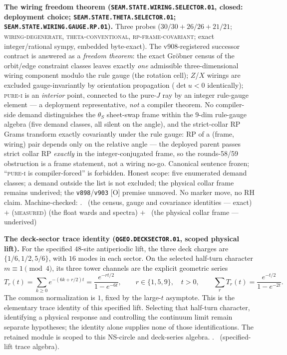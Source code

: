 \documentclass[11pt,a4paper]{article}
\theoremstyle{definition}
\begin{document}
\par\smallskip\noindent\textbf{The wiring freedom theorem
(\texttt{SEAM.STATE.WIRING.\allowbreak SELECTOR.01}, closed:
deployment choice;
\texttt{SEAM.STATE.THETA.\allowbreak SELECTOR.01};
\texttt{SEAM.STATE.WIRING.\allowbreak GAUGE.RP.01}).}
Three probes ($30/30 + 26/26 + 21/21$;
\textsc{wiring-degenerate}, \textsc{theta-conventional},
\textsc{rp-frame-covariant}; exact integer/rational sympy,
embedded byte-exact).  The v908-registered successor contract
is answered as a \emph{freedom theorem}: the exact Gr\"obner
census of the orbit/edge constraint classes leaves exactly
\emph{one} admissible three-dimensional wiring component modulo
the rule gauge (the rotation cell); $Z$/$X$ wirings are
excluded gauge-invariantly by orientation propagation
($\det u < 0$ identically); \textsc{pure-i} is an
\emph{interior} point, connected to the pure-$J$ ray by an
integer rule-gauge element --- a deployment representative,
\emph{not} a compiler theorem.  No compiler-side demand
distinguishes the $\theta_S$ sheet-swap frame within the
$9$-dim rule-gauge algebra (five demand classes, all silent on
the angle), and the strict-collar RP Grams transform exactly
covariantly under the rule gauge: RP of a (frame, wiring) pair
depends only on the relative angle --- the deployed parent
passes strict collar RP \emph{exactly} in the
integer-conjugated frame, so the rounds-58/59 obstruction is a
frame statement, not a wiring no-go.  Canonical sentence
frozen; ``\textsc{pure-i} is compiler-forced'' is forbidden.
Honest scope: five enumerated demand classes; a demand outside
the list is not excluded; the physical collar frame remains
underived; the \texttt{v898}/\texttt{v903} [O] premise
unmoved.  No marker move, no RH claim.
Machine-checked: .
\mE\ (the census, gauge and covariance identities --- exact)
$+$ (\textsc{measured}) (the float wards and spectra) $+$
\mO\ (the physical collar frame --- underived)
\par\smallskip

\par\smallskip\noindent\textbf{The deck-sector trace identity
(\texttt{QGEO.DECKSECTOR.01}, scoped physical lift).}
For the specified $48$-site antiperiodic lift, the three deck charges are
$\{1/6,1/2,5/6\}$, with $16$ modes in each sector.  On the selected
half-turn character $m\equiv1\pmod4$, its three tower channels are the
explicit geometric series
\[
 T_r(t)=\sum_{k\ge0}e^{-(6k+r/2)t}
       =\frac{e^{-rt/2}}{1-e^{-6t}},\qquad r\in\{1,5,9\},\quad t>0,
 \qquad\sum_rT_r(t)=\frac{e^{-t/2}}{1-e^{-2t}}.
\]
The common normalization is $1$, fixed by the large-$t$ asymptote.
This is the elementary trace identity of this specified lift.  Selecting
that half-turn character, identifying a physical response and controlling
the continuum limit remain separate hypotheses; the identity alone supplies
none of those identifications.  The retained module is scoped to this
NS-circle and deck-series algebra.
. \mE\ (specified-lift trace algebra).
\par\smallskip
\end{document}
